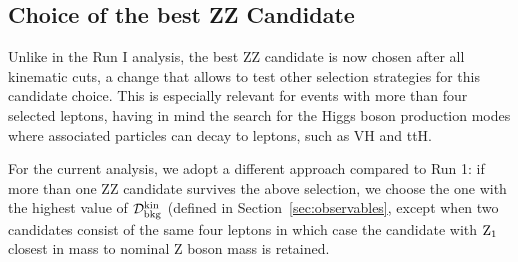 \subsection{Choice of the best ZZ Candidate}
\label{sec:zzbestcand}

Unlike in the Run I analysis, the best ZZ candidate is now chosen after all kinematic cuts, a change that allows to test other selection strategies for this candidate choice. 
This is especially relevant for events with more than four selected leptons, having in mind the search for the Higgs boson production modes where associated particles can decay to leptons, such as VH and ttH.

For the current analysis, we adopt a different approach compared to Run 1: if more than one ZZ candidate survives the above selection,
we choose the one with the highest value of ${\cal D}^{\rm kin}_{\rm bkg}$ (defined in Section~\ref{sec:observables}, except when
two candidates consist of the same four leptons in which case the candidate with ${\rm Z_1}$ closest in mass to nominal 
Z boson mass is retained.

